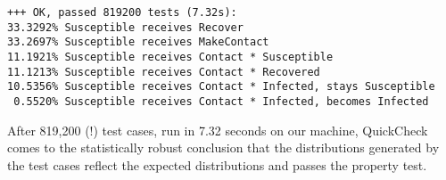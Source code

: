 \begin{footnotesize}
\begin{verbatim}
+++ OK, passed 819200 tests (7.32s):
33.3292% Susceptible receives Recover
33.2697% Susceptible receives MakeContact
11.1921% Susceptible receives Contact * Susceptible
11.1213% Susceptible receives Contact * Recovered
10.5356% Susceptible receives Contact * Infected, stays Susceptible
 0.5520% Susceptible receives Contact * Infected, becomes Infected
\end{verbatim}
\end{footnotesize}

After 819,200 (!) test cases, run in 7.32 seconds on our machine, QuickCheck comes to the statistically robust conclusion that the distributions generated by the test cases reflect the expected distributions and passes the property test.